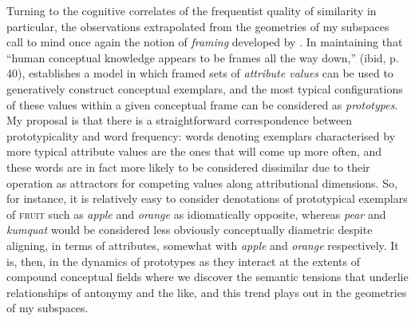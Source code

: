 Turning to the cognitive correlates of the frequentist quality of similarity in particular, the observations extrapolated from the geometries of my subspaces call to mind once again the notion of \emph{framing} developed by \cite{Barsalou1992}.  In maintaining that ``human conceptual knowledge appears to be frames all the way down,'' (ibid, p. 40), \citeauthor{Barsalou1992} establishes a model in which framed sets of \emph{attribute values} can be used to generatively construct conceptual exemplars, and the most typical configurations of these values within a given conceptual frame can be considered as \emph{prototypes}.  My proposal is that there is a straightforward correspondence between prototypicality and word frequency: words denoting exemplars characterised by more typical attribute values are the ones that will come up more often, and these words are in fact more likely to be considered dissimilar due to their operation as attractors for competing values along attributional dimensions.  So, for instance, it is relatively easy to consider denotations of prototypical exemplars of \textsc{fruit} such as \emph{apple} and \emph{orange} as idiomatically opposite, whereas \emph{pear} and \emph{kumquat} would be considered less obviously conceptually diametric despite aligning, in terms of attributes, somewhat with \emph{apple} and \emph{orange} respectively.  It is, then, in the dynamics of prototypes as they interact at the extents of compound conceptual fields where we discover the semantic tensions that underlie relationships of antonymy and the like, and this trend plays out in the geometries of my subspaces.


